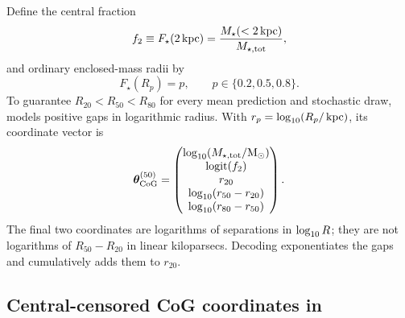 Define the central fraction
\begin{equation}
  f_2\equiv F_\star(2\,\mathrm{kpc})
  =\frac{M_\star(<2\,\mathrm{kpc})}{M_{\star,\rm tot}},
  \label{eq:f2}
\end{equation}
and ordinary enclosed-mass radii by
\begin{equation}
  F_\star(R_p)=p,\qquad p\in\{0.2,0.5,0.8\}.
  \label{eq:ordinary_quantiles}
\end{equation}
To guarantee $R_{20}<R_{50}<R_{80}$ for every mean prediction and stochastic
draw, \ExpFifty{} models positive gaps in logarithmic radius. With
$r_p=\log_{10}(R_p/\,\mathrm{kpc})$, its coordinate vector is
\begin{equation}
  \bm{\theta}_{\mathrm{CoG}}^{(50)}=
  \begin{pmatrix}
    \log_{10}(M_{\star,\rm tot}/\mathrm{M}_{\odot})\\
    \operatorname{logit}(f_2)\\
    r_{20}\\
    \log_{10}(r_{50}-r_{20})\\
    \log_{10}(r_{80}-r_{50})
  \end{pmatrix}.
  \label{eq:exp50_coordinates}
\end{equation}
The final two coordinates are logarithms of separations in $\log_{10} R$; they
are not logarithms of $R_{50}-R_{20}$ in linear kiloparsecs. Decoding exponentiates
the gaps and cumulatively adds them to $r_{20}$.

\subsection{Central-censored CoG coordinates in \ExpFiftyOne{}}
\label{sec:exp51_coordinates}


